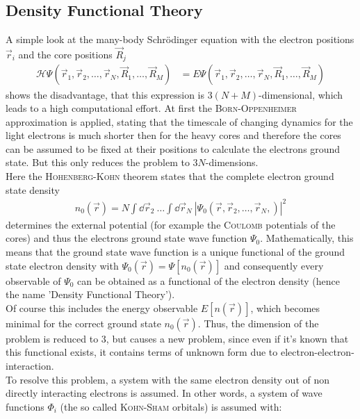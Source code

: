 \subsection{Density Functional Theory}
A simple look at the many-body Schrödinger equation with the electron positions $\vec{r}_i$ and the core positions $\vec{R}_j$
\begin{align}
	\mathcal{H} \Psi\left(\vec{r}_1,\vec{r}_2,\dots,\vec{r}_N,\vec{R}_1,\dots,\vec{R}_M\right) &= E \Psi\left(\vec{r}_1,\vec{r}_2,\dots,\vec{r}_N,\vec{R}_1,\dots,\vec{R}_M\right)
\end{align}
shows the disadvantage, that this expression is $3(N+M)$-dimensional, which leads to a high computational effort.
At first the \textsc{Born-Oppenheimer} approximation is applied, stating that the timescale of changing dynamics for the light electrons is much shorter then for the heavy cores and therefore the cores can be assumed to be fixed at their positions to calculate the electrons ground state. But this only reduces the problem to $3N$-dimensions.\\
Here the \textsc{Hohenberg-Kohn} theorem states that the complete electron ground state density
\begin{align}
n_0\left(\vec{r}\right) = N\int\dd\vec{r}_2\ \dots\int\dd\vec{r}_N\ \left|\Psi_0\left(\vec{r}, \vec{r}_2, \dots,\vec{r}_N,\right)\right|^2
\end{align}
determines the external potential (for example the \textsc{Coulomb} potentials of the cores) and thus the electrons ground state wave function $\Psi_0$. Mathematically, this means that the ground state wave function is a unique functional of the ground state electron density with $\Psi_0\left(\vec{r}\right) = \Psi\left[n_0\left(\vec{r}\right)\right]$ and consequently every observable of $\Psi_0$ can be obtained as a functional of the electron density (hence the name 'Density Functional Theory').\\
Of course this includes the energy observable $E[n\left(\vec{r}\right)]$, which becomes minimal for the correct ground state $n_0\left(\vec{r}\right)$. Thus, the dimension of the problem is reduced to $3$, but causes a new problem, since even if it's known that this functional exists, it contains terms of unknown form due to electron-electron-interaction.\\
To resolve this problem, a system with the same electron density out of non directly interacting electrons is assumed. In other words, a system of wave functions $\varPhi_i$ (the so called \textsc{Kohn-Sham} orbitals) is assumed with:
